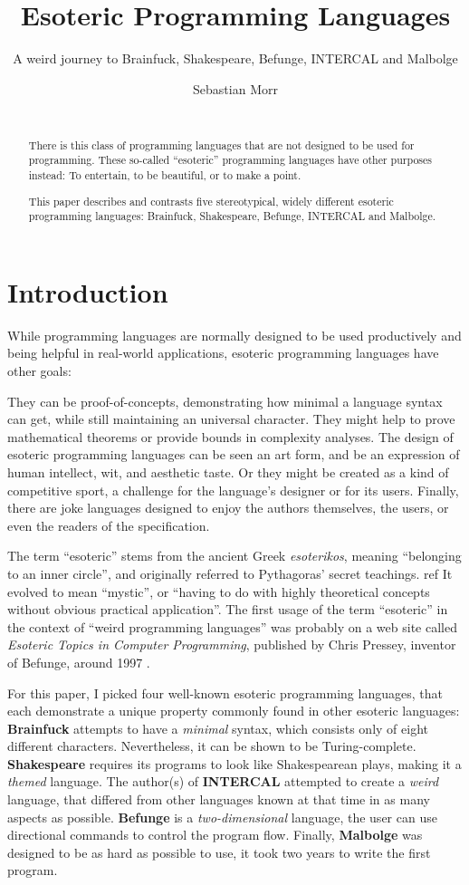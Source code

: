 \documentclass{sig-alternate}
\title{Esoteric Programming Languages}
\subtitle{A weird journey to Brainfuck, Shakespeare, Befunge, INTERCAL and Malbolge}
\author{\alignauthor Sebastian Morr\\\affaddr{Technical University Braunschweig, Germany}\\\email{sebastian@morr.cc}}
\begin{document}
\maketitle

\begin{abstract}
    There is this class of programming languages that are not designed to be used for programming. These so-called “esoteric” programming languages have other purposes instead: To entertain, to be beautiful, or to make a point.

    This paper describes and contrasts five stereotypical, widely different esoteric programming languages: Brainfuck, Shakespeare, Befunge, INTERCAL and Malbolge.
\end{abstract}

\section{Introduction}

While programming languages are normally designed to be used productively and being helpful in real-world applications, esoteric programming languages have other goals:

They can be proof-of-concepts, demonstrating how minimal a language syntax can get, while still maintaining an universal character. They might help to prove mathematical theorems or provide bounds in complexity analyses. The design of esoteric programming languages can be seen an art form, and be an expression of human intellect, wit, and aesthetic taste. Or they might be created as a kind of competitive sport, a challenge for the language's designer or for its users. Finally, there are joke languages designed to enjoy the authors themselves, the users, or even the readers of the specification.

The term “esoteric” stems from the ancient Greek \emph{esoterikos}, meaning “belonging to an inner circle”, and originally referred to Pythagoras' secret teachings. ref It evolved to mean “mystic”, or “having to do with highly theoretical concepts without obvious practical application”. The first usage of the term “esoteric” in the context of “weird programming languages” was probably on a web site called \emph{Esoteric Topics in Computer Programming}, published by Chris Pressey, inventor of Befunge, around 1997 \cite{pressey2005chris}.

For this paper, I picked four well-known esoteric programming languages, that each demonstrate a unique property commonly found in other esoteric languages: \textbf{Brainfuck} attempts to have a \textit{minimal} syntax, which consists only of eight different characters. Nevertheless, it can be shown to be Turing-complete. \textbf{Shakespeare} requires its programs to look like Shakespearean plays, making it a \textit{themed} language. The author(s) of \textbf{INTERCAL} attempted to create a \textit{weird} language, that differed from other languages known at that time in as many aspects as possible. \textbf{Befunge} is a \textit{two-dimensional} language, the user can use directional commands to control the program flow. Finally, \textbf{Malbolge} was designed to be as hard as possible to use, it took two years to write the first program.
\end{document}
